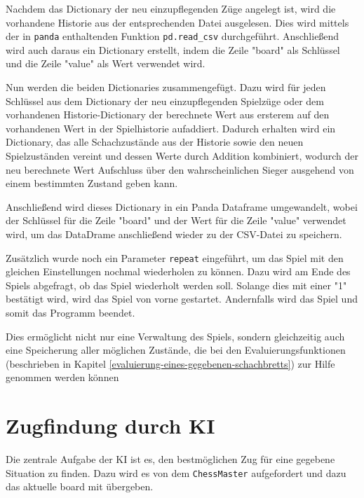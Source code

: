 Nachdem das Dictionary der neu einzupflegenden Züge angelegt ist, wird
die vorhandene Historie aus der entsprechenden Datei ausgelesen. Dies
wird mittels der in \texttt{panda} enthaltenden Funktion
\texttt{pd.read\_csv} durchgeführt. Anschließend wird auch daraus ein
Dictionary erstellt, indem die Zeile "board" als Schlüssel und die Zeile
"value" als Wert verwendet wird.

Nun werden die beiden Dictionaries zusammengefügt. Dazu wird für jeden
Schlüssel aus dem Dictionary der neu einzupflegenden Spielzüge oder dem
vorhandenen Historie-Dictionary der berechnete Wert aus ersterem auf den
vorhandenen Wert in der Spielhistorie aufaddiert. Dadurch erhalten wird
ein Dictionary, das alle Schachzustände aus der Historie sowie den neuen
Spielzuständen vereint und dessen Werte durch Addition kombiniert,
wodurch der neu berechnete Wert Aufschluss über den wahrscheinlichen
Sieger ausgehend von einem bestimmten Zustand geben kann.

Anschließend wird dieses Dictionary in ein Panda Dataframe umgewandelt,
wobei der Schlüssel für die Zeile "board" und der Wert für die Zeile
"value" verwendet wird, um das DataDrame anschließend wieder zu der
CSV-Datei zu speichern.

Zusätzlich wurde noch ein Parameter \texttt{repeat} eingeführt, um das
Spiel mit den gleichen Einstellungen nochmal wiederholen zu können. Dazu
wird am Ende des Spiels abgefragt, ob das Spiel wiederholt werden soll.
Solange dies mit einer "1" bestätigt wird, wird das Spiel von vorne
gestartet. Andernfalls wird das Spiel und somit das Programm beendet.

    Dies ermöglicht nicht nur eine Verwaltung des Spiels, sondern
gleichzeitig auch eine Speicherung aller möglichen Zustände, die bei den
Evaluierungsfunktionen (beschrieben in Kapitel \ref{evaluierung-eines-gegebenen-schachbretts}) zur Hilfe genommen werden können

    \section{Zugfindung durch KI}\label{zugfindung-durch-ki}

Die zentrale Aufgabe der KI ist es, den bestmöglichen Zug für eine
gegebene Situation zu finden. Dazu wird es
von dem \texttt{ChessMaster} aufgefordert und dazu das aktuelle
board mit übergeben.

